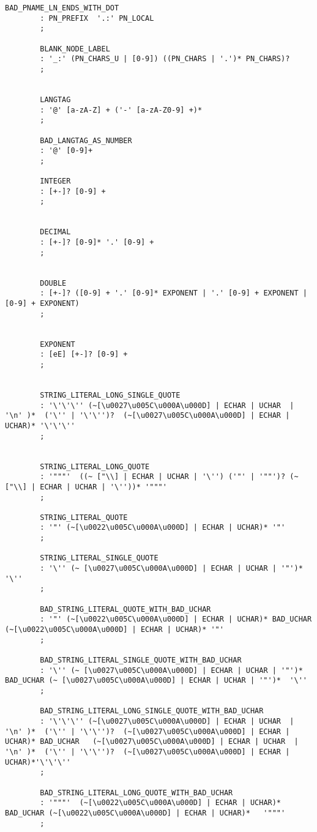 \begin{lstlisting}[breaklines,basicstyle=\ttfamily]
		BAD_PNAME_LN_ENDS_WITH_DOT	  
		: PN_PREFIX  '.:' PN_LOCAL 
		;
		
		BLANK_NODE_LABEL
		: '_:' (PN_CHARS_U | [0-9]) ((PN_CHARS | '.')* PN_CHARS)?
		;
		
		
		LANGTAG
		: '@' [a-zA-Z] + ('-' [a-zA-Z0-9] +)*
		;
		
		BAD_LANGTAG_AS_NUMBER
		: '@' [0-9]+
		;
		
		INTEGER
		: [+-]? [0-9] +
		;
		
		
		DECIMAL
		: [+-]? [0-9]* '.' [0-9] +
		;
		
		
		DOUBLE
		: [+-]? ([0-9] + '.' [0-9]* EXPONENT | '.' [0-9] + EXPONENT | [0-9] + EXPONENT)
		;
		
		
		EXPONENT
		: [eE] [+-]? [0-9] +
		;
		
		
		STRING_LITERAL_LONG_SINGLE_QUOTE
		: '\'\'\'' (~[\u0027\u005C\u000A\u000D] | ECHAR | UCHAR  | '\n' )*  ('\'' | '\'\'')?  (~[\u0027\u005C\u000A\u000D] | ECHAR | UCHAR)* '\'\'\''  
		;
		
		
		STRING_LITERAL_LONG_QUOTE
		: '"""'  ((~ ["\\] | ECHAR | UCHAR | '\'') ('"' | '""')? (~ ["\\] | ECHAR | UCHAR | '\''))* '"""'
		;
		
		STRING_LITERAL_QUOTE
		: '"' (~[\u0022\u005C\u000A\u000D] | ECHAR | UCHAR)* '"' 
		;
		
		STRING_LITERAL_SINGLE_QUOTE
		: '\'' (~ [\u0027\u005C\u000A\u000D] | ECHAR | UCHAR | '"')* '\''
		;
		
		BAD_STRING_LITERAL_QUOTE_WITH_BAD_UCHAR
		: '"' (~[\u0022\u005C\u000A\u000D] | ECHAR | UCHAR)* BAD_UCHAR (~[\u0022\u005C\u000A\u000D] | ECHAR | UCHAR)* '"' 
		;
		
		BAD_STRING_LITERAL_SINGLE_QUOTE_WITH_BAD_UCHAR
		: '\'' (~ [\u0027\u005C\u000A\u000D] | ECHAR | UCHAR | '"')*  BAD_UCHAR (~ [\u0027\u005C\u000A\u000D] | ECHAR | UCHAR | '"')*  '\''
		;
		
		BAD_STRING_LITERAL_LONG_SINGLE_QUOTE_WITH_BAD_UCHAR
		: '\'\'\'' (~[\u0027\u005C\u000A\u000D] | ECHAR | UCHAR  | '\n' )*  ('\'' | '\'\'')?  (~[\u0027\u005C\u000A\u000D] | ECHAR | UCHAR)* BAD_UCHAR   (~[\u0027\u005C\u000A\u000D] | ECHAR | UCHAR  | '\n' )*  ('\'' | '\'\'')?  (~[\u0027\u005C\u000A\u000D] | ECHAR | UCHAR)*'\'\'\''  
		;
		
		BAD_STRING_LITERAL_LONG_QUOTE_WITH_BAD_UCHAR
		: '"""'  (~[\u0022\u005C\u000A\u000D] | ECHAR | UCHAR)*   BAD_UCHAR (~[\u0022\u005C\u000A\u000D] | ECHAR | UCHAR)*   '"""'
		;
		

\end{lstlisting}

